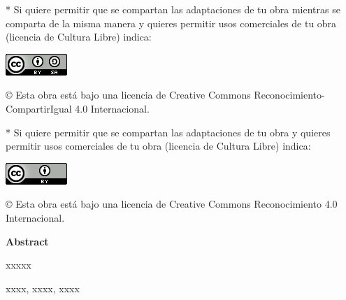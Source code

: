 \documentclass[spanish,a4paper,12pt,oneside]{extreport}
\newenvironment{summary}
{\par\noindent\begin{center}\textbf{Abstract}\end{center}\begin{itshape}\par\noindent}
{\end{itshape}}
\newenvironment{keywords}
{\begin{list}{}{\setlength{\leftmargin}{1em}}\item[\hskip\labelsep \bfseries Keywords:]}
{\end{list}}
\newenvironment{palabrasClave}
{\begin{list}{}{\setlength{\leftmargin}{1em}}\item[\hskip\labelsep \bfseries Palabras clave:]}
{\end{list}}
\begin{document}
\bigskip
\bigskip
\bigskip
* Si quiere permitir que se compartan las adaptaciones de tu obra mientras se comparta de la misma manera y quieres permitir usos comerciales de tu obra (licencia de Cultura Libre) indica:

\begin{center}
\includegraphics[scale=1.8]{images/by-sa_88x31}\\[5mm]
\end{center}

\begin{large}
© Esta obra está bajo una licencia de Creative Commons Reconocimiento-CompartirIgual 4.0 Internacional.
\end{large}

\bigskip
\bigskip
\bigskip
* Si quiere permitir que se compartan las adaptaciones de tu obra y quieres permitir usos comerciales de tu obra (licencia de Cultura Libre) indica:

\begin{center}
\includegraphics[scale=1.8]{images/by_88x31}\\[5mm]
\end{center}

\begin{large}
© Esta obra está bajo una licencia de Creative Commons Reconocimiento 4.0 Internacional.
\end{large}

\newpage 
\thispagestyle{empty}

\begin{abstract}
{\em
xxxxx
}

\begin{palabrasClave}
xxxxx, xxxx, xxxx
\end{palabrasClave}

\end{abstract}
\newpage 
\vspace*{200px}
\thispagestyle{empty}

\begin{summary}
{
xxxxx
}

\em
\begin {keywords}
xxxx, xxxx, xxxx
\end {keywords}

\end{summary}
\newpage{\pagestyle{empty}}
\thispagestyle{empty}
\end{document}
